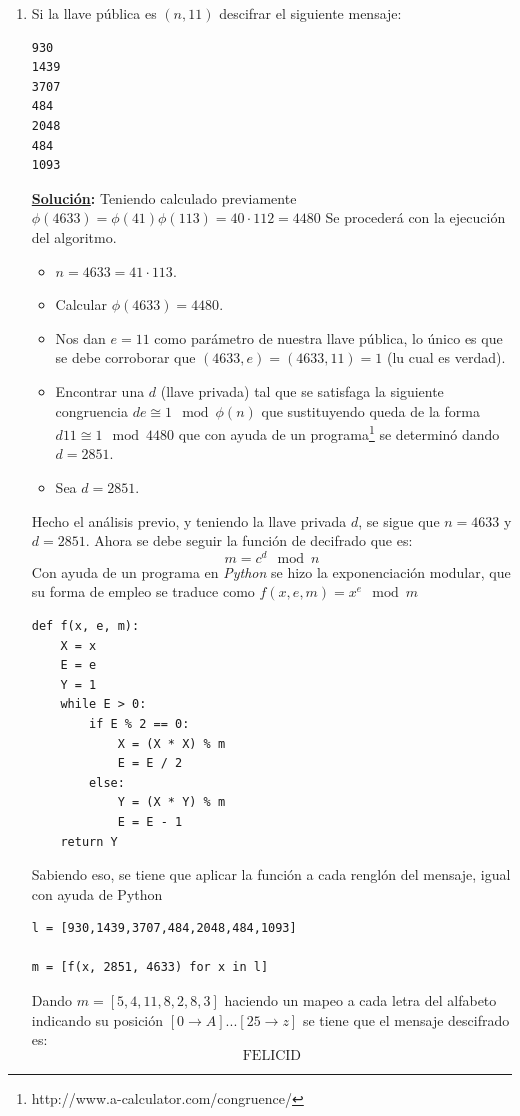 \documentclass[11pt,letterpaper]{article}
\newcommand{\sol}{\textbf{\underline{Solución}: }} %
\begin{document}
\begin{enumerate}[label=\alph*)]
\item Si la llave pública es $(n,11)$ descifrar el siguiente mensaje:
\begin{lstlisting}
930
1439
3707
484
2048
484
1093
\end{lstlisting}
\sol Teniendo calculado previamente $\phi(4633) = \phi(41)\phi(113) = 40 \cdot 112 = 4480$ Se procederá
con la ejecución del algoritmo.
\begin{itemize}
    \item $n=4633= 41 \cdot 113$.
    \item Calcular $\phi(4633) = 4480$.
    \item Nos dan $e=11$ como parámetro de nuestra llave pública, lo único es que se debe corroborar
    que $(4633,e) = (4633, 11) = 1$ (lu cual es verdad).
    \item Encontrar una $d$ (llave privada) tal que se satisfaga la siguiente congruencia 
    $de \cong 1 \mod{\phi(n)}$ que sustituyendo queda de la forma
    $d11 \cong 1 \mod{4480}$ que con ayuda de un programa\footnote{http://www.a-calculator.com/congruence/}
    se determinó dando $d=2851$.
    \item Sea $d=2851$.
\end{itemize}
Hecho el análisis previo, y teniendo la llave privada $d$, se sigue que $n=4633$ y $d=2851$. Ahora
se debe seguir la función de decifrado que es:
$$m = c^d \mod{n}$$
Con ayuda de un programa en \textit{Python} se hizo la exponenciación modular, que su forma de empleo
se traduce como $f(x,e,m) = x^e \mod{m}$
\begin{verbatim}
def f(x, e, m):
    X = x
    E = e
    Y = 1
    while E > 0:
        if E % 2 == 0:
            X = (X * X) % m
            E = E / 2
        else:
            Y = (X * Y) % m
            E = E - 1
    return Y
\end{verbatim}
Sabiendo eso, se tiene que aplicar la función a cada renglón del mensaje, igual con ayuda de Python

\begin{verbatim}
l = [930,1439,3707,484,2048,484,1093]

m = [f(x, 2851, 4633) for x in l]
\end{verbatim}
Dando $m = [5, 4, 11, 8, 2, 8, 3]$ haciendo un mapeo a cada letra del alfabeto indicando su posición 
$[0 \rightarrow A] ... [25 \rightarrow z]$ se tiene que el mensaje descifrado es:
$$\text{FELICID}$$


\end{enumerate}
\end{document}
